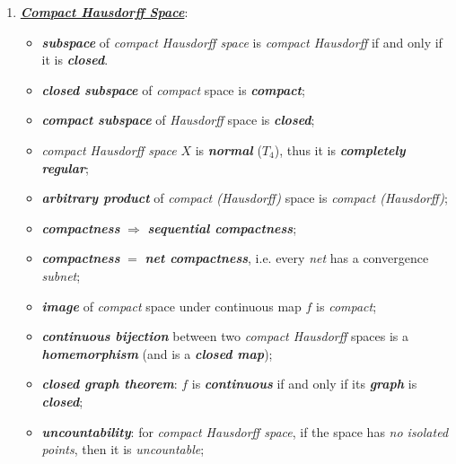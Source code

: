 \documentclass[11pt]{article}
\begin{document}
\begin{remark}
\begin{enumerate}
\item \underline{\emph{\textbf{Compact Hausdorff Space}}}:
\begin{itemize}
\item \emph{\textbf{subspace}} of \emph{compact Hausdorff space} is \emph{compact Hausdorff} if and only if it is \emph{\textbf{closed}}. 
\item \emph{\textbf{closed subspace}} of \emph{compact} space is \emph{\textbf{compact}}; 
\item \emph{\textbf{compact subspace}} of \emph{Hausdorff} space is \emph{\textbf{closed}};
\item \emph{compact Hausdorff space} $X$ is \textbf{\emph{normal}} ($T_4$), thus it is \emph{\textbf{completely regular}};
\item \emph{\textbf{arbitrary product}} of \emph{compact (Hausdorff)}  space is \emph{compact (Hausdorff)};
\item \emph{\textbf{compactness}} $\Rightarrow$ \emph{\textbf{sequential compactness}};
\item  \emph{\textbf{compactness}} $=$ \emph{\textbf{net compactness}}, i.e. every \emph{net} has a convergence \emph{subnet};
\item \emph{\textbf{image}} of \emph{compact} space under continuous map $f$ is \emph{compact};
\item \emph{\textbf{continuous bijection}} between two \emph{compact Hausdorff} spaces is a \emph{\textbf{homemorphism}} (and is a \emph{\textbf{closed map}});
\item \emph{\textbf{closed graph theorem}}: $f$ is \emph{\textbf{continuous}} if and only if its \emph{\textbf{graph}} is \emph{\textbf{closed}};
\item \emph{\textbf{uncountability}}: for \emph{compact Hausdorff space}, if the space has \emph{no isolated points}, then it is \emph{uncountable};
\end{itemize}
\end{enumerate}
\end{remark}
\end{document}
